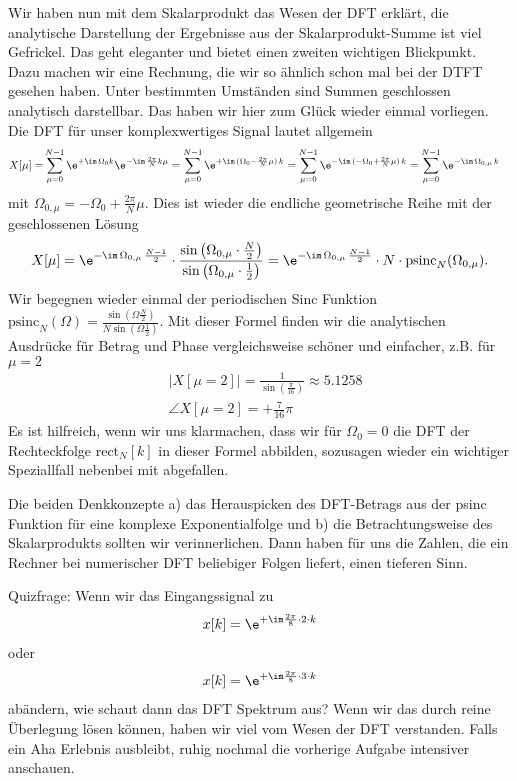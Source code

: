 \begin{ExCalc}
Wir haben nun mit dem Skalarprodukt das Wesen der DFT erklärt,
die analytische Darstellung der Ergebnisse aus der Skalarprodukt-Summe
ist viel Gefrickel.
%
Das geht eleganter und bietet einen zweiten wichtigen Blickpunkt. Dazu
machen wir eine Rechnung, die wir so ähnlich schon mal bei der DTFT gesehen haben.
Unter bestimmten Umständen sind Summen geschlossen analytisch darstellbar.
Das haben wir hier zum Glück wieder einmal vorliegen.
Die DFT für unser komplexwertiges Signal lautet allgemein
\begin{align}
X[\mu] =& \sum_{\mu=0}^{N-1} \e^{+\im\,\Omega_0 k} \e^{-\im\,\frac{2\pi}{N} k \mu}
=  \sum_{\mu=0}^{N-1} \e^{+\im\,(\Omega_0 - \frac{2\pi}{N} \mu) \, k}
=  \sum_{\mu=0}^{N-1} \e^{-\im\,(-\Omega_0 + \frac{2\pi}{N} \mu) \, k}
=  \sum_{\mu=0}^{N-1} \e^{-\im\, \Omega_{0,\mu} \,k}
\end{align}
mit $\Omega_{0,\mu} = -\Omega_0 + \frac{2\pi}{N} \mu$.
Dies ist wieder die endliche geometrische Reihe mit der geschlossenen Lösung
\begin{align}
X[\mu] = \e^{-\im \,\Omega_{0,\mu}\,\frac{N-1}{2}} \cdot
\frac{\sin\left(\Omega_{0,\mu}\cdot\frac{N}{2}\right)}{\sin\left(\Omega_{0,\mu}\cdot\frac{1}{2}\right)}
=\e^{-\im \,\Omega_{0,\mu}\,\frac{N-1}{2}} \cdot N \cdot \mathrm{psinc}_N(\Omega_{0,\mu})
.
\end{align}
Wir begegnen wieder einmal der periodischen Sinc Funktion $\mathrm{psinc}_N(\Omega) = \frac{\sin({\Omega\frac{N}{2}})}{N \sin({\Omega\frac{1}{2}})}$.
%
Mit dieser Formel finden wir die analytischen Ausdrücke für Betrag und Phase
vergleichsweise schöner und einfacher, z.B. für $\mu=2$
\begin{align}
&|X[\mu=2]| = \frac{1}{\sin(\frac{\pi}{16})} \approx 5.1258\\
&\angle X[\mu=2] = +\frac{7}{16}\pi
\end{align}
Es ist hilfreich, wenn wir uns klarmachen, dass wir für $\Omega_0=0$ die DFT der
Rechteckfolge $\mathrm{rect}_N[k]$
in dieser Formel abbilden, sozusagen wieder ein wichtiger Speziallfall nebenbei mit abgefallen.

Die beiden Denkkonzepte a) das Herauspicken des DFT-Betrags aus der psinc Funktion
für eine komplexe Exponentialfolge und b) die Betrachtungsweise des
Skalarprodukts sollten wir verinnerlichen. Dann haben für uns die Zahlen,
die ein Rechner bei numerischer DFT beliebiger Folgen liefert, einen tieferen
Sinn.

Quizfrage: Wenn wir das Eingangssignal zu
\begin{align}
x[k] = \e^{+\im \frac{2\pi}{8} \cdot 2 \cdot k}
\end{align}
oder
\begin{align}
x[k] = \e^{+\im \frac{2\pi}{8} \cdot 3 \cdot k}
\end{align}
abändern, wie schaut dann das DFT Spektrum aus? Wenn wir das durch reine
Überlegung lösen können, haben wir viel vom Wesen der DFT
verstanden.
%
Falls ein Aha Erlebnis ausbleibt, ruhig nochmal die vorherige Aufgabe
intensiver anschauen.

\end{ExCalc}

